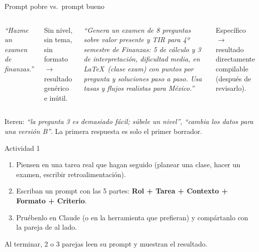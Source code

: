 \documentclass[aspectratio=169,10pt]{beamer}
\begin{document}
\begin{frame}{Prompt pobre vs.\ prompt bueno}
\begin{columns}[T]
\begin{tcolorbox}[enhanced,colback=Al!6,colframe=Al,arc=2mm,title={\faTimesCircle\ Pobre},fonttitle=\bfseries\color{white},colbacktitle=Al]
\centering\emph{``Hazme un examen de finanzas.''}
\end{tcolorbox}
\vspace{6pt}
\small Sin nivel, sin tema, sin formato $\rightarrow$ resultado genérico e inútil.
\begin{tcolorbox}[enhanced,colback=Ac2!6,colframe=Ac2,arc=2mm,title={\faCheckCircle\ Bueno},fonttitle=\bfseries\color{white},colbacktitle=Ac2]
\centering\footnotesize\emph{``Genera un examen de 8 preguntas sobre valor presente y TIR para 4º semestre de Finanzas: 5 de cálculo y 3 de interpretación, dificultad media, en \LaTeX\ (clase exam) con puntos por pregunta y soluciones paso a paso. Usa tasas y flujos realistas para México.''}
\end{tcolorbox}
\vspace{6pt}
\small Específico $\rightarrow$ resultado directamente compilable (después de revisarlo).
\end{columns}
\vspace{8pt}
\begin{tipbox}
Iteren: \emph{``la pregunta 3 es demasiado fácil; súbele un nivel''}, \emph{``cambia los datos para una versión B''}. La primera respuesta es solo el primer borrador.
\end{tipbox}
\end{frame}

\begin{frame}{Actividad 1}
\begin{actividadbox}
\begin{enumerate}
  \item Piensen en una tarea real que hagan seguido (planear una clase, hacer un examen, escribir retroalimentación).
  \item Escriban un prompt con las 5 partes: \textbf{Rol + Tarea + Contexto + Formato + Criterio}.
  \item Pruébenlo en Claude (o en la herramienta que prefieran) y compártanlo con la pareja de al lado.
\end{enumerate}
\end{actividadbox}
\vspace{10pt}
\centering\large\color{Dp} Al terminar, 2 o 3 parejas leen su prompt y muestran el resultado.
\end{frame}
\end{document}
